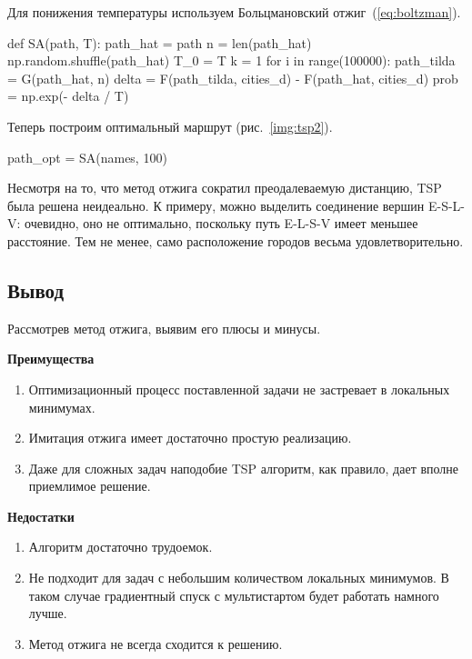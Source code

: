 Для понижения температуры используем Больцмановский отжиг~(\ref{eq:boltzman}).

\begin{pyin}
def SA(path, T):
  path_hat = path
  n = len(path_hat)
  np.random.shuffle(path_hat)
  T_0 = T
  k = 1
  for i in range(100000):
     path_tilda = G(path_hat, n)
     delta = F(path_tilda, cities_d) - F(path_hat, cities_d)
     prob = np.exp(- delta / T)
\end{pyin}

Теперь построим оптимальный маршрут (рис.~\ref{img:tsp2}).

\begin{pyin}
path_opt = SA(names, 100)
\end{pyin}

Несмотря на то, что метод отжига сократил преодалеваемую дистанцию, TSP была решена неидеально. К примеру, можно выделить соединение вершин E-S-L-V: очевидно, оно не оптимально, поскольку путь E-L-S-V имеет меньшее расстояние. Тем не менее, само расположение городов весьма удовлетворительно.

\subsection{Вывод}

\noindent
Рассмотрев метод отжига, выявим его плюсы и минусы.

\noindent
\textbf{Преимущества}

\begin{enumerate}
	\item  Оптимизационный процесс поставленной задачи не застревает в локальных минимумах.

	\item Имитация отжига имеет достаточно простую реализацию.

	\item Даже для сложных задач наподобие TSP алгоритм, как правило, дает вполне приемлимое решение.
\end{enumerate}

\noindent
\textbf{Недостатки}

\begin{enumerate}
	\item Алгоритм достаточно трудоемок.

	\item Не подходит для задач с небольшим количеством локальных минимумов. В таком случае градиентный спуск с мультистартом будет работать намного лучше.

	\item Метод отжига не всегда сходится к решению.
\end{enumerate}


